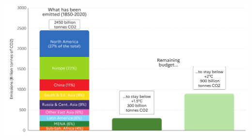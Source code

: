 \begin{frame}
\begin{scriptsize}
\begin{columns}
      \begin{center}
        \includegraphics[width=1.0\textwidth]{plots/WIR_budget_emitted_and_allowed}
      \end{center}      
    \end{columns}

  \end{scriptsize}
  \end{frame}  

